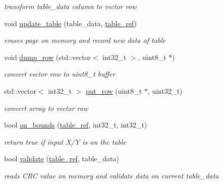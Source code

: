 \begin{DoxyCompactItemize}
\begin{DoxyCompactList}\small\item\em transform table\+\_\+data column to vector row \end{DoxyCompactList}\item 
\mbox{\label{namespacetables_a609889745ffc450440eee727f8d28034}} 
void \hyperlink{namespacetables_a609889745ffc450440eee727f8d28034}{update\+\_\+table} (table\+\_\+data, \hyperlink{structtable__ref}{table\+\_\+ref})
\begin{DoxyCompactList}\small\item\em erases page on memory and record new data of table \end{DoxyCompactList}\item 
void \hyperlink{namespacetables_a3d4eae2328222f2672364baad17b14eb}{dump\+\_\+row} (std\+::vector$<$ int32\+\_\+t $>$, uint8\+\_\+t $\ast$)
\begin{DoxyCompactList}\small\item\em convert vector row to uint8\+\_\+t buffer \end{DoxyCompactList}\item 
std\+::vector$<$ int32\+\_\+t $>$ \hyperlink{namespacetables_aacb653c68579815b85eca89c831e9300}{put\+\_\+row} (uint8\+\_\+t $\ast$, uint32\+\_\+t)
\begin{DoxyCompactList}\small\item\em convert array to vector row \end{DoxyCompactList}\item 
\mbox{\label{namespacetables_a5df27daa6f33383e90a21d0ea12f6d9f}} 
bool \hyperlink{namespacetables_a5df27daa6f33383e90a21d0ea12f6d9f}{on\+\_\+bounds} (\hyperlink{structtable__ref}{table\+\_\+ref}, int32\+\_\+t, int32\+\_\+t)
\begin{DoxyCompactList}\small\item\em return true if input X/Y is on the table \end{DoxyCompactList}\item 
\mbox{\label{namespacetables_ad914a29af149c1059b5fcfb1501f6d87}} 
bool \hyperlink{namespacetables_ad914a29af149c1059b5fcfb1501f6d87}{validate} (\hyperlink{structtable__ref}{table\+\_\+ref}, table\+\_\+data)
\begin{DoxyCompactList}\small\item\em reads C\+RC value on memory and validate data on current table\+\_\+data \end{DoxyCompactList}\item 

\end{DoxyCompactItemize}
